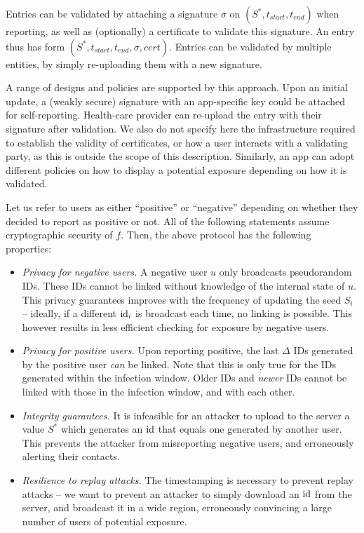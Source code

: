 \documentclass{article}
\begin{document}

 Entries can be validated by attaching a signature $\sigma$ on $(S^*, t_{start}, t_{end})$ when reporting, as well as (optionally) a certificate to validate this signature. An entry thus has form $(S^*, t_{start}, t_{end}, \sigma, cert)$. Entries can be validated by multiple entities, by simply re-uploading them with a new signature.

A range of designs and policies are supported by this approach. Upon an initial update, a (weakly secure) signature with an app-specific key could be attached for self-reporting. Health-care provider can re-upload the entry with their signature after validation. We also do not specify here the infrastructure required to establish the validity of certificates, or how a user interacts with a validating party, as this is outside the scope of this description. Similarly, an app can adopt different policies on how to display a potential exposure depending on how it is validated.


 Let us refer to users as either ``positive'' or ``negative'' depending on whether they decided to report as positive or not. All of the following statements assume cryptographic security of $f$. Then, the above protocol has the following properties:
\begin{itemize}
    \item {\em Privacy for negative users.}  A negative user $u$ only broadcasts pseudorandom IDs. These IDs cannot be linked without knowledge of the internal state of $u$. This privacy guarantees improves with the frequency of updating the seed $S_i$ -- ideally, if a different $\mathrm{id}_i$ is broadcast each time, no linking is possible. This however results in less efficient checking for exposure by negative users.
    \item {\em Privacy for positive users.} Upon reporting positive, the last $\Delta$ IDs generated by the positive user {\em can} be linked. Note that this is only true for the IDs generated within the infection window. Older IDs and {\em newer} IDs cannot be linked with those in the infection window, and with each other.
    \item {\em Integrity guarantees.} It is infeasible for an attacker to upload to the server a value $S^*$ which generates an $\mathrm{id}$ that equals one generated by another user. This prevents the attacker from misreporting negative users, and erroneously alerting their contacts.  
    \item {\em Resilience to replay attacks.} The timestamping is necessary to prevent replay attacks -- we want to prevent an attacker to simply download an $\mathrm{id}$ from the server, and broadcast it in a wide region, erroneously convincing a large number of users of potential exposure.
\end{itemize}
\end{document}

